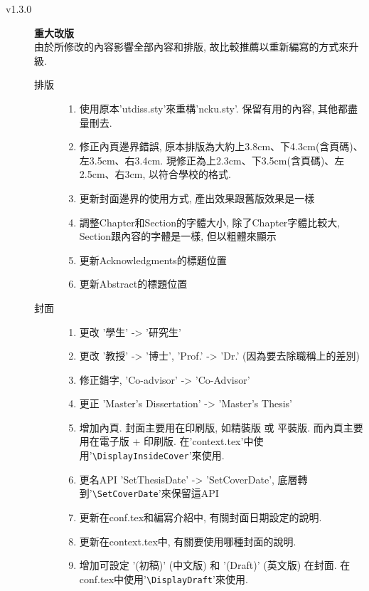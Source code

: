 \begin{description}
  \item[v1.3.0] \textbf{重大改版}\\
    由於所修改的內容影響全部內容和排版, 故比較推薦以重新編寫的方式來升級.\hfill
    \begin{description}
      \item[排版] \hfill
        \begin{enumerate}
          \item 使用原本'utdiss.sty'來重構'ncku.sty'. 保留有用的內容, 其他都盡量刪去.
          \item 修正內頁邊界錯誤, 原本排版為大約上3.8cm、下4.3cm(含頁碼)、左3.5cm、右3.4cm. 現修正為上2.3cm、下3.5cm(含頁碼)、左2.5cm、右3cm, 以符合學校的格式.
          \item 更新封面邊界的使用方式, 產出效果跟舊版效果是一樣
          \item 調整Chapter和Section的字體大小, 除了Chapter字體比較大, Section跟內容的字體是一樣, 但以粗體來顯示
          \item 更新Acknowledgments的標題位置
          \item 更新Abstract的標題位置
        \end{enumerate}
      \item[封面] \hfill
        \begin{enumerate}
          \item 更改 '學生' -> '研究生'
          \item 更改 '教授' -> '博士', 'Prof.' -> 'Dr.' (因為要去除職稱上的差別)
          \item 修正錯字, 'Co-advisor' -> 'Co-Advisor'
          \item 更正 'Master's Dissertation' -> 'Master's Thesis'
          \item 增加內頁. 封面主要用在印刷版, 如精裝版 或 平裝版. 而內頁主要用在電子版 + 印刷版. 在'context.tex'中使用'\verb|\DisplayInsideCover|'來使用.
          \item 更名API 'SetThesisDate' -> 'SetCoverDate', 底層轉到'\verb|\SetCoverDate|'來保留這API
          \item 更新在conf.tex和編寫介紹中, 有關封面日期設定的說明.
          \item 更新在context.tex中, 有關要使用哪種封面的說明.
          \item 增加可設定 '(初稿)' (中文版) 和 '(Draft)' (英文版) 在封面. 在conf.tex中使用'\verb|\DisplayDraft|'來使用.
        \end{enumerate}

\end{description}
\end{description}
